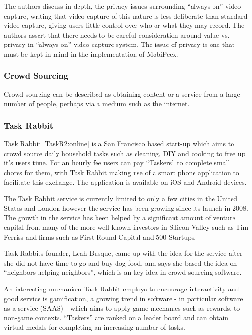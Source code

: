 \documentclass[a4paper]{article}
\begin{document}
The authors discuss in depth, the privacy issues surrounding ``always on'' video capture, writing that video capture of this nature is less deliberate than standard video capture, giving users little control over who or what they may record. The authors assert that there needs to be careful consideration around value vs. privacy in ``always on'' video capture system. The issue of privacy is one that must be kept in mind in the implementation of MobiPeek.




\subsubsection{Crowd Sourcing}
Crowd sourcing can be described as obtaining content or a service from a large number of people, perhaps via a medium such as the internet. 
  
\subsubsection{Task Rabbit}


Task Rabbit \ref{TaskR2:online} is a San Francisco based start-up which aims to crowd source daily household tasks such as cleaning, DIY and cooking to free up it's users time. For an hourly fee users can pay ``Taskers'' to complete small chores for them, with Task Rabbit making use of a smart phone application to facilitate this exchange. The application is available on iOS and Android devices.

The Task Rabbit service is currently limited to only a few cities in the United States and London however the service has been growing since its launch in 2008. The growth in the service has been helped by a significant amount of venture capital from many of the more well known investors in Silicon Valley such as Tim Ferriss and firms such as First Round Capital and 500 Startups.

Task Rabbits founder, Leah Busque, came up with the idea for the service after she did not have time to go and buy dog food, and says she based the idea on “neighbors helping neighbors”, which is an key idea in crowd sourcing software. 

An interesting mechanism Task Rabbit employs to encourage interactivity and good service is gamification, a growing trend in software - in particular software as a service (SAAS) - which aims to apply game mechanics such as rewards, to non-game contexts. ``Taskers'' are ranked on a leader board and can obtain virtual medals for completing an increasing number of tasks. 
\end{document}
